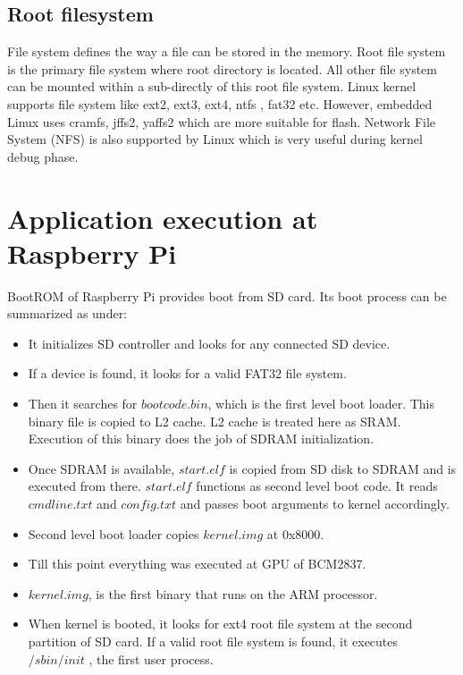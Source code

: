 \subsection {Root filesystem}
\indent File system defines the way a file can be stored in the memory.
Root file system is the primary file system where root directory is
located. All other file system can be mounted within a sub-directly of
this root file system. Linux kernel supports file system like ext2,
ext3, ext4, ntfs , fat32 etc. However, embedded Linux uses cramfs,
jffs2, yaffs2 which are more suitable for flash. Network File System
(NFS) is also supported by Linux which is very useful during kernel
debug phase.
\section {Application execution at Raspberry Pi}
BootROM of Raspberry Pi provides boot from SD card. Its boot process can
be summarized as under:
\begin{itemize}
 \item It initializes SD controller and looks for any connected
 SD device.
 \item If a device is found, it looks for a valid FAT32 file
 system.
 \item Then it searches for $bootcode.bin$, which is the first
 level boot loader. This binary file is copied to L2
 cache. L2 cache is treated here as SRAM. Execution of
 this binary does the job of SDRAM initialization.
 \item Once SDRAM is available, $start.elf$ is copied from SD
 disk to SDRAM and is executed from there. $start.elf$
 functions as second level boot code. It reads
 $cmdline.txt$ and $config.txt$ and passes boot arguments to
 kernel accordingly.
 \item Second level boot loader copies $kernel.img$ at 0x8000.
 \item Till this point everything was executed at GPU of BCM2837.
 \item $kernel.img$, is the first binary that runs on the ARM
 processor.
 \item When kernel is booted, it looks for ext4 root file system at
 the second partition of SD card. If a valid root file
 system is found, it executes $/sbin/init$ , the first user
 process.
\end{itemize}
